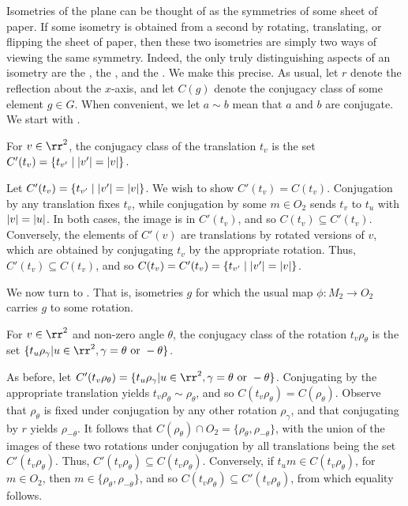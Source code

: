 \documentclass{scrartcl}
\begin{document}
\begin{solution}
        Isometries of the plane can be thought of as the symmetries of some sheet of paper. If some isometry is obtained from a second by rotating, translating, or flipping the sheet of paper, then these two isometries are simply two ways of viewing the same symmetry. Indeed, the only truly distinguishing aspects of an isometry are the , the , and the . We make this precise. As usual, let $r$ denote the reflection about the $x$-axis, and let $C(g)$ denote the conjugacy class of some element $g\in G$. When convenient, we let $a\sim b$ mean that $a$ and $b$ are conjugate. We start with .
        \begin{lemma}
        For $v\in \rr^2$, the conjugacy class of the translation $t_v$ is the set $C'(t_v)=\{t_{v'}\mid \lvert v'\rvert=\lvert v\rvert\}$.
        \end{lemma}
        \begin{subproof}
        Let $C'(t_v)=\{t_{v'}\mid \lvert v'\rvert=\lvert v\rvert\}$. We wish to show $C'(t_v)=C(t_v)$. Conjugation by any translation fixes $t_v$, while conjugation by some $m\in O_2$ sends $t_v$ to $t_u$ with $\lvert v\rvert=\lvert u\rvert$. In both cases, the image is in $C'(t_v)$, and so $C(t_v)\subseteq C'(t_v)$. Conversely, the elements of $C'(v)$ are translations by rotated versions of $v$, which are obtained by conjugating $t_v$ by the appropriate rotation. Thus, $C'(t_v)\subseteq C(t_v)$, and so $C(t_v)=C'(t_v)=\{t_{v'}\mid \lvert v'\rvert=\lvert v\rvert\}$.
        \end{subproof}
    
        We now turn to . That is, isometries $g$ for which the usual map $\phi: M_2 \to O_2$ carries $g$ to some rotation.
        \begin{lemma}
        For $v\in \rr^2$ and non-zero angle $\theta$, the conjugacy class of the rotation $t_v\rho_\theta$ is the set $\{t_u\rho_\gamma| u\in \rr^2, \gamma=\theta \text{ or } -\theta\}$.
        \end{lemma}
        \begin{subproof} As before, let $C'(t_v\rho_\theta)=\{t_u\rho_\gamma| u\in \rr^2, \gamma=\theta \text{ or } -\theta\}$. Conjugating by the appropriate translation yields $t_v\rho_\theta\sim \rho_\theta$, and so $C(t_v\rho_\theta)=C(\rho_\theta)$. Observe that $\rho_\theta$ is fixed under conjugation by any other rotation $\rho_\gamma$, and that conjugating by $r$ yields $\rho_{-\theta}$. It follows that $C(\rho_\theta)\cap O_2=\{\rho_{\theta},\rho_{-\theta}\}$, with the union of the images of these two rotations under conjugation by all translations being the set $C'(t_v\rho_\theta)$. Thus, $C'(t_v\rho_\theta)\subseteq C(t_v\rho_\theta)$. Conversely, if $t_um\in C(t_v\rho_\theta)$, for $m\in O_2$, then $m\in \{\rho_{\theta},\rho_{-\theta}\}$, and so $C(t_v\rho_\theta)\subseteq C'(t_v\rho_\theta)$, from which equality follows.
        \end{subproof}
    

\end{solution}
\end{document}
